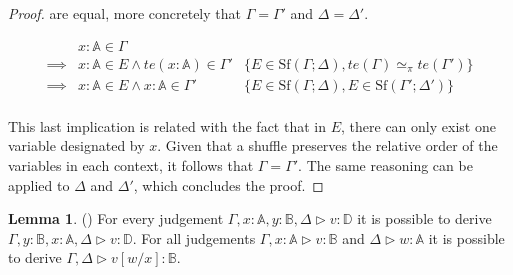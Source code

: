 \documentclass[10pt,a4paper]{amsart}
\theoremstyle{definition}
\theoremstyle{definition}
\theoremstyle{definition}
\newtheorem{lemma}[definition]{Lemma}
\theoremstyle{definition}
\theoremstyle{definition}
\theoremstyle{definition}
\begin{document}
\begin{proof}
are equal, more concretely that $\Gamma = \Gamma'$ and $\Delta = \Delta'$. 

\begin{align*}
  & x: \mathbb{A}  \in \Gamma & \\
  \implies & x: \mathbb{A}  \in E \land   te(x:\mathbb{A}) \in \Gamma'  & \{E \in \text{Sf}(\Gamma;\Delta), te(\Gamma) \simeq_{\pi}  te(\Gamma') \} \\
  \implies & x: \mathbb{A}  \in E \land  x:\mathbb{A} \in \Gamma'  & \{ E \in \text{Sf}(\Gamma;\Delta),E \in \text{Sf}(\Gamma';\Delta') \} \\
\end{align*}

This last implication is related with the fact that in $E$, there can only exist one  variable designated by $x$. Given that a shuffle preserves the relative order of the variables in each context, it follows that $\Gamma = \Gamma'$. The same reasoning can be applied to $\Delta$ and $\Delta'$, which concludes the proof. 


  \end{proof}

  \begin{lemma} \label {exh_and_sub} () For every judgement $\Gamma,x:\mathbb{A}, y:\mathbb{B}, \Delta \triangleright v: \mathbb{D}$ it is possible to derive $\Gamma, y:\mathbb{B}, x:\mathbb{A}, \Delta \triangleright v: \mathbb{D}$. For all judgements  $\Gamma,x:\mathbb{A} \triangleright v: \mathbb{B}$ and $\Delta \triangleright w: \mathbb{A}$ it is possible to derive $ \Gamma, \Delta \triangleright v[w/x]: \mathbb{B}$.
  \end{lemma}
\end{document}
